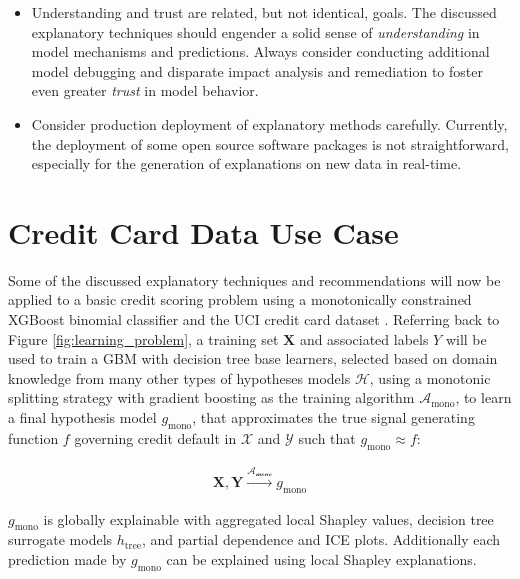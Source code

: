 \documentclass[sigconf]{acmart}
\begin{document}
\begin{itemize}
	\item Understanding and trust are related, but not identical, goals. The discussed explanatory techniques should engender a solid sense of \textit{understanding} in model mechanisms and predictions. Always consider conducting additional model debugging and disparate impact analysis and remediation to foster even greater \textit{trust} in model behavior.\\
	
	\item Consider production deployment of explanatory methods carefully. Currently, the deployment of some open source software packages is not straightforward, especially for the generation of explanations on new data in real-time.\\
	
\end{itemize}

\section{Credit Card Data Use Case} \label{sec:use_case}

Some of the discussed explanatory techniques and recommendations will now be applied to a basic credit scoring problem using a monotonically constrained XGBoost binomial classifier and the UCI credit card dataset \cite{uci}. Referring back to Figure \ref{fig:learning_problem}, a training set $\mathbf{X}$ and associated labels $Y$ will be used to train a GBM with decision tree base learners, selected based on domain knowledge from many other types of hypotheses models $\mathcal{H}$, using a monotonic splitting strategy with gradient boosting as the training algorithm $\mathcal{A}_{\text{mono}}$, to learn a final hypothesis model $g_{\text{mono}}$, that approximates the true signal generating function $f$ governing credit default in $\mathcal{X}$ and $\mathcal{Y}$ such that $g_{\text{mono}} \approx f$:

\begin{equation}
\label{eq:cc_training}
\begin{aligned}
\mathbf{X}, \mathbf{Y} \xrightarrow{\mathcal{A_{\text{mono}}}} g_{\text{mono}}
\end{aligned}
\end{equation}

\noindent$g_{\text{mono}}$ is globally explainable with aggregated local Shapley values, decision tree surrogate models $h_{\text{tree}}$, and partial dependence and ICE plots. Additionally each prediction made by $g_{\text{mono}}$ can be explained using local Shapley explanations. 
\end{document}
